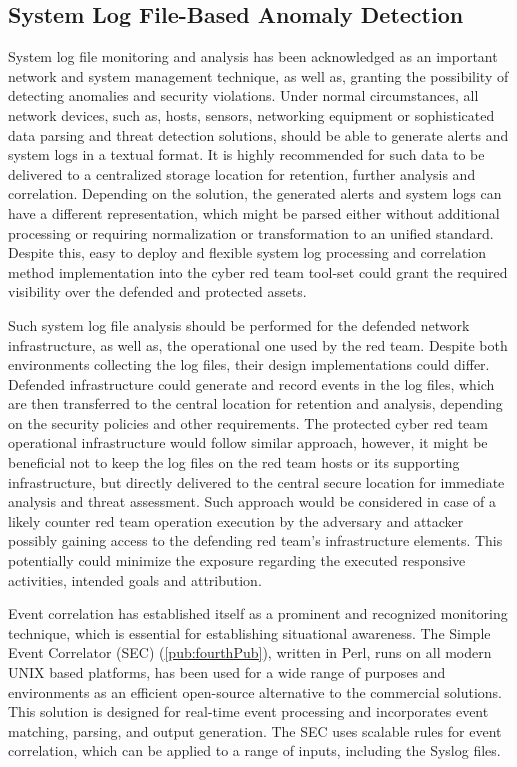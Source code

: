 \subsection{System Log File-Based Anomaly Detection}
System log file monitoring and analysis has been acknowledged as an important network and system management technique, as well as, granting the possibility of detecting anomalies and security violations.
Under normal circumstances, all network devices, such as, hosts, sensors, networking equipment or sophisticated data parsing and threat detection solutions, should be able to generate alerts and system logs in a textual format. It is highly recommended for such data to be delivered to a centralized storage location for retention, further analysis and correlation. Depending on the solution, the generated alerts and system logs can have a different representation, which might be parsed either without additional processing or requiring normalization or transformation to an unified standard. Despite this, easy to deploy and flexible system log processing and correlation method implementation into the cyber red team tool-set could grant the required visibility over the defended and protected assets.

Such system log file analysis should be performed for the defended network infrastructure, as well as, the operational one used by the red team.
Despite both environments collecting the log files, their design implementations could differ. Defended infrastructure could generate and record events in the log files, which are then transferred to the central location for retention and analysis, depending on the security policies and other requirements. The protected cyber red team operational infrastructure would follow similar approach, however, it might be beneficial not to keep the log files on the red team hosts or its supporting infrastructure, but directly delivered to the central secure location for immediate analysis and threat assessment. Such approach would be considered in case of a likely counter red team operation execution by the adversary and attacker possibly gaining access to the defending red team's infrastructure elements. This potentially could minimize the exposure regarding the executed responsive activities, intended goals and attribution.

Event correlation has established itself as a prominent and recognized monitoring technique, which is essential for establishing situational awareness.
The Simple Event Correlator (SEC) (\ref{pub:fourthPub}), written in Perl, runs on all modern UNIX based platforms, has been used for a wide range of purposes and environments as an efficient open-source alternative to the commercial solutions. This solution is designed for real-time event processing and incorporates event matching, parsing, and output generation.
The SEC uses scalable rules for event correlation, which can be applied to a range of inputs, including the Syslog files.

